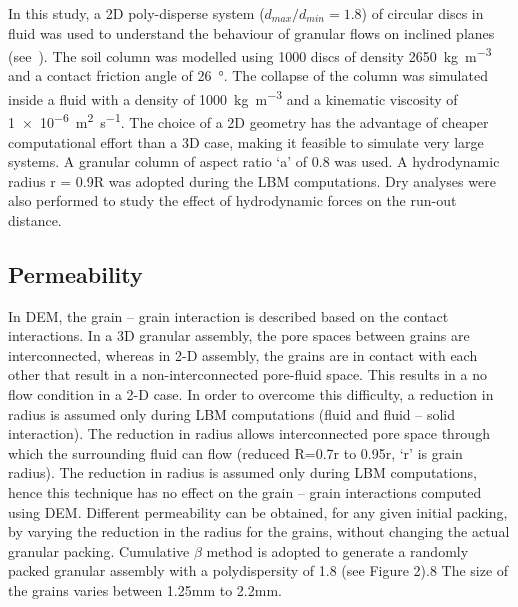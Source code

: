 In this study, a 2D poly-disperse system ($d_{max}/d_{min} = 1.8$) of circular 
discs in fluid was used to understand the behaviour of granular flows on 
inclined planes (see~). The soil column was modelled using 1000 
discs of density \SI{2650}{\kg\per\cubic\meter} and a contact friction angle of 
\SI{26}{\degree}. The collapse of the column was simulated inside a fluid with 
a density of \SI{1000}{\kg\per\cubic\meter}  and a kinematic viscosity of 
\SI{1e-6}{\square\meter\per\second}. The choice of a 2D geometry has the 
advantage of cheaper computational effort than a 3D case, making it feasible to 
simulate very large systems. A granular column of aspect ratio `a' of 0.8 was 
used. A hydrodynamic radius r = 0.9R was adopted during the LBM computations. 
Dry analyses were also performed to study the effect of hydrodynamic forces on 
the run-out distance.

\subsection{Permeability}

In DEM, the grain – grain interaction is described based on the contact 
interactions. In a 3D granular assembly, the pore spaces between grains are 
interconnected, whereas in 2-D assembly, the grains are in contact with each 
other that result in a non-interconnected pore-fluid space. This results in a 
no flow condition in a 2-D case. In order to overcome this difficulty, a 
reduction in radius is assumed only during LBM computations (fluid and fluid – 
solid interaction). The reduction in radius allows interconnected pore space 
through which the surrounding fluid can flow (reduced R=0.7r to 0.95r, ‘r’ is 
grain radius). The reduction in radius is assumed only during LBM computations, 
hence this technique has no effect on the grain – grain interactions computed 
using DEM. Different permeability can be obtained, for any given initial 
packing, by varying the reduction in the radius for the grains, without 
changing the actual granular packing. Cumulative $\beta$ method is adopted to 
generate a randomly packed granular assembly with a polydispersity of 1.8 (see 
Figure 2).8 The size of the grains varies between 1.25mm to 2.2mm. 

